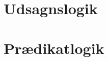 \documentclass[a4paper]{article}
\theoremstyle{definition}
\theoremstyle{remark}
\begin{document}
\section{Udsagnslogik}


\section{Prædikatlogik}

\end{document}
